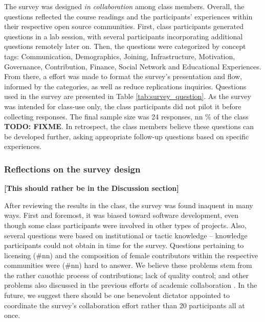 The survey was designed {\it in collaboration} among class members. Overall, the questions reflected the course 
readings and the participants' experiences within their respective open source communities. First, class 
participants generated questions in a lab session, with several participants incorporating additional questions remotely later on. 
Then, the questions were categorized by concept tags: Communication, Demographics, Joining, Infrastructure, Motivation,
Governance, Contribution, Finance, Social Network and Educational Experiences. From there, a effort was made to format the survey's 
presentation and flow, informed by the categories, as well as reduce replications inquiries. Questions used in the survey 
are presented in Table \ref{tab:survey_question}. As the survey was intended for class-use only, the class participants did not pilot it before collecting 
responses. The final sample size was 24 responses, nn \% of the class \textbf{TODO: FIXME}. In retrospect, the class members believe these questions can be 
developed further, asking appropriate follow-up questions based on specific experiences.

\subsubsection{Reflections on the survey design}

{\bf [This should rather be in the Discussion section]}

After reviewing the results in the class, the survey was found inaquent in many ways. First and foremost, it was biased 
toward software development, even though some class participants were involved in other types of projects. Also, several questions were based 
on institutional or tactic knowledge -- knowledge participants could not obtain in time for the survey. Questions pertaining to licensing (\#nn) and the composition 
of female contributors within the respective communities were (\#nn) hard to answer. We believe these problems stem from the rather cauothic process of contributions; 
lack of quality control; and other problems also discussed in the previous efforts of academic collaboration \cite{Tomlinson2012}. In the future, we suggest there should be 
one benevolent dictator appointed to coordinate the survey's collaboration effort rather than 20 participants all at once. 

